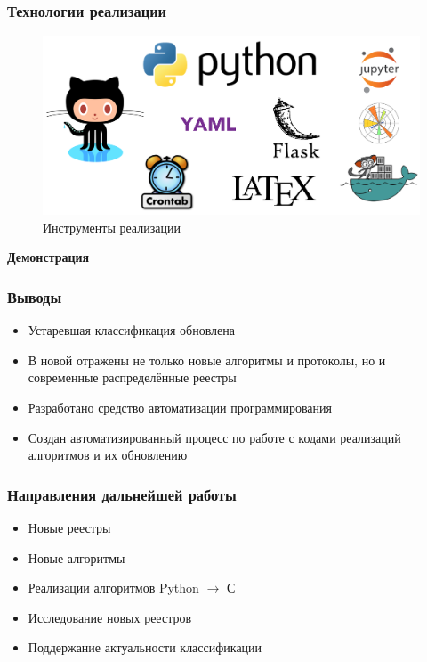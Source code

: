 \documentclass{beamer}
\begin{document}
\begin{frame}
    \frametitle{Технологии реализации}
    \begin{figure}
        \includegraphics[width=\columnwidth]{tech.png}
        \caption{\small Инструменты реализации}
    \end{figure}
\end{frame}

\begin{frame}
    \centering
    \LARGE \bfseries \color{white}
    Демонстрация
\end{frame}

\begin{frame}
    \frametitle{Выводы}
    \begin{itemize}
        \item[\checkmark] Устаревшая классификация обновлена
        \item[\checkmark] В новой отражены не только новые алгоритмы и
                          протоколы, но и современные распределённые реестры
        \item[\checkmark] Разработано средство автоматизации программирования
        \item[\checkmark] Создан автоматизированный процесс по работе с кодами
                          реализаций алгоритмов и их обновлению
    \end{itemize}
\end{frame}

\begin{frame}
    \frametitle{Направления дальнейшей работы}
    \begin{itemize}
        \item Новые реестры
        \item Новые алгоритмы
        \item Реализации алгоритмов Python $\rightarrow$ С
        \item Исследование новых реестров
        \item Поддержание актуальности классификации
    \end{itemize}
\end{frame}
\end{document}
